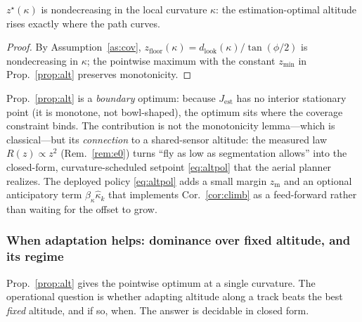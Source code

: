 \begin{corollary}\label{cor:climb}
$z^\star(\kappa)$ is nondecreasing in the local curvature $\kappa$: the
estimation-optimal altitude rises exactly where the path curves.
\end{corollary}

\begin{proof}
By Assumption~\ref{as:cov}, $z_{\mathrm{floor}}(\kappa)=d_{\mathrm{look}}(\kappa)/
\tan(\phi/2)$ is nondecreasing in $\kappa$; the pointwise maximum with the
constant $z_{\min}$ in Prop.~\ref{prop:alt} preserves monotonicity.
\end{proof}

\begin{remark}\label{rem:boundary}
Prop.~\ref{prop:alt} is a \emph{boundary} optimum: because $J_{\mathrm{est}}$ has
no interior stationary point (it is monotone, not bowl-shaped), the optimum sits
where the coverage constraint binds. The contribution is not the monotonicity
lemma---which is classical---but its \emph{connection} to a shared-sensor
altitude: the measured law $R(z)\propto z^2$ (Rem.~\ref{rem:e0}) turns
``fly as low as segmentation allows'' into the closed-form,
curvature-scheduled setpoint \eqref{eq:altpol} that the aerial planner realizes.
The deployed policy \eqref{eq:altpol} adds a small margin $z_{\mathrm m}$ and an
optional anticipatory term $\beta_\kappa\hat\kappa_k$ that implements
Cor.~\ref{cor:climb} as a feed-forward rather than waiting for the offset to grow.
\end{remark}

\subsubsection*{When adaptation helps: dominance over fixed altitude, and its regime}

Prop.~\ref{prop:alt} gives the pointwise optimum at a single curvature. The operational
question is whether adapting altitude along a track beats the best \emph{fixed} altitude,
and if so, when. The answer is decidable in closed form.

